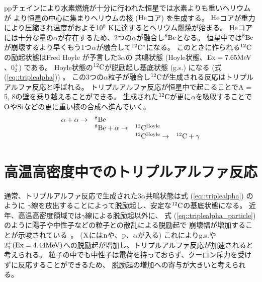 ppチェインにより水素燃焼が十分に行われた恒星では水素よりも重いヘリウムが
より恒星の中心に集まりヘリウムの核 ($\rm{He}$コア) を生成する。
$\rm{He}$コアが重力により圧縮され温度がおよそ$10^8~\rm{K}$に達するとヘリウム燃焼が始まる。
$\rm{He}$コアには十分な量の$\alpha$が存在するため、2つの$\alpha$が融合し${}^{8}\rm{Be}$となる。
恒星中では${}^{8}\rm{Be}$が崩壊するより早くもう1つ$\alpha$が融合して${}^{12}\rm{C}^{*}$になる。
このときに作られる${}^{12}\rm{C}$の励起状態はFred Hoyle が予言した$3\alpha$の
共鳴状態 (Hoyle状態、$\rm{Ex} = 7.65\rm{MeV}$、$0_{2}^{+}$) である。
Hoyle状態の${}^{12}\rm{C}$が脱励起し基底状態 (g.s.) になる (式(\ref{eq::triplealpha})) 。
この3つの$\alpha$粒子が融合し${}^{12}\rm{C}$が生成される反応はトリプルアルファ反応と呼ばれる。
トリプルアルファ反応が恒星中で起こることでA = 5, 8の壁を乗り越えることができる。
生成された${}^{12}\rm{C}$が更に$\alpha$を吸収することで$\rm{O}$や$\rm{Si}$などの更に重い核の合成へ進んでいく。
\begin{equation}
  \begin{array}{llll}
    \alpha + \alpha \rightarrow & {}^{8}\rm{Be} & & \\
    & {}^{8}\rm{Be} + \alpha \rightarrow & {}^{12}\rm{C}^{Hoyle} &\\
    & & {}^{12}\rm{C}^{Hoyle} \rightarrow & {}^{12}\rm{C} + \gamma
  \end{array}\label{eq::triplealpha}
\end{equation}

\section{高温高密度中でのトリプルアルファ反応}
\label{seq::triplealphareaction}
通常、トリプルアルファ反応で生成された$3\alpha$共鳴状態は式 (\ref{eq::triplealpha}) のように
$\gamma$線を放出することによって脱励起し、安定な${}^{12}\rm{C}$の基底状態になる。
近年、高温高密度領域では$\gamma$線による脱励起以外に、
式 (\ref{eq::triplealpha_particle}) のように陽子や中性子などの粒子との散乱による脱励起で
崩壊幅が増加することが示唆されている~\cite{hotdensemedium}。
($\rm{X}$には$\rm{n}$や、$\rm{p}$、$\alpha$が入る)
これによりg.s.や$2_{1}^{+} (\rm{Ex} = 4.44 \rm{MeV}) $への脱励起が増加し、トリプルアルファ反応が加速されると考えられる。
粒子の中でも中性子は電荷を持っておらず、クーロン斥力を受けずに反応することができるため、
脱励起の増加への寄与が大きいと考えられる。

